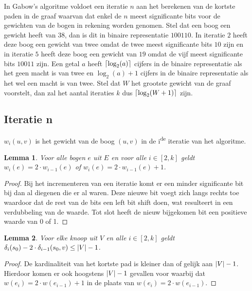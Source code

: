 \documentclass[conference]{IEEEtran}
\newtheorem{lemma}{Lemma}[section]
\theoremstyle{definition}
\DeclarePairedDelimiter{\ceil}{\lceil}{\rceil}
\DeclarePairedDelimiter{\card}{\vert}{\vert}  %
\begin{document}
In Gabow's algoritme voldoet een iteratie $n$ aan het berekenen van de kortste paden in de graaf waarvan dat enkel de $n$ meest significante bits voor de gewichten van de bogen in rekening worden genomen. Stel dat een boog een gewicht heeft van $38$, dan is dit in binaire representatie $100110$. In iteratie $2$ heeft deze boog een gewicht van twee omdat de twee meest significante bits $10$ zijn en in iteratie $5$ heeft deze boog een gewicht van $19$ omdat de vijf meest significante bits $10011$ zijn. Een getal $a$ heeft $\ceil{\log_2(a)}$ cijfers in de binaire representatie als het geen macht is van twee en $\log_2(a) + 1$ cijfers in de binaire representatie als het wel een macht is van twee. Stel dat $W$ het grootste gewicht van de graaf voorstelt, dan zal het aantal iteraties $k$ dus $\ceil{\log_2(W + 1)}$ zijn.

\subsection{Iteratie n}
$w_i(u, v)$ is het gewicht van de boog $(u, v)$ in de i\textsuperscript{de} iteratie van het algoritme.
\begin{lemma} \label{scaling:doubleThePrevious}
    Voor alle bogen $e$ uit $E$ en voor alle $i \in [2, k]$ geldt $w_i(e) = 2 \cdot w_{i-1}(e)$ of $w_i(e) = 2 \cdot w_{i-1}(e) + 1$.
\end{lemma}
\begin{proof}
    Bij het incrementeren van een iteratie komt er een minder significante bit bij dan al diegenen die er al waren. Deze nieuwe bit voegt zich langs rechts toe waardoor dat de rest van de bits een left bit shift doen, wat resulteert in een verdubbeling van de waarde. Tot slot heeft de nieuw bijgekomen bit een positieve waarde van 0 of 1.
\end{proof}

\begin{lemma} \label{theorem:maxTheAmountOfVertices}
    Voor elke knoop uit $V$ en alle $i \in [2, k]$ geldt $\delta_i(s_0) - 2 \cdot \delta_{i-1}(s_0, v) \leq \card{V} -1$.
\end{lemma}

\begin{proof}
    De kardinaliteit van het kortste pad is kleiner dan of gelijk aan $\card{V} - 1$. Hierdoor komen er ook hoogstens $\card{V} - 1$ gevallen voor waarbij dat $w(e_i) = 2 \cdot w(e_{i-1}) + 1$ in de plaats van $w(e_i) = 2 \cdot w(e_{i-1})$.
\end{proof}
\end{document}
